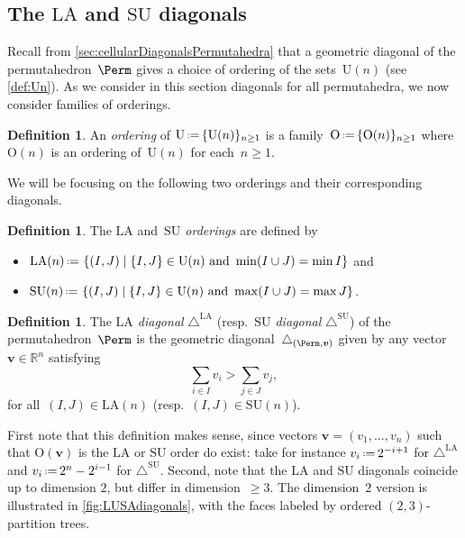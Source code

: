 \documentclass{amsart}
\newcommand{\darkblue}{\color{darkblue}} %
\theoremstyle{definition}
\newtheorem{definition}[theorem]{Definition}
\newcommand{\R}{\mathbb{R}} %
\renewcommand{\b}[1]{{\boldsymbol{#1}}} %
\newcommand{\Un}{\mathrm{U}} %
\newcommand{\Or}{\mathrm{O}} %
\newcommand{\set}[2]{\left\{ #1 \;\middle|\; #2 \right\}} %
\newcommand{\eqdef}{\mbox{\,\raisebox{0.2ex}{\scriptsize\ensuremath{\mathrm:}}\ensuremath{=}\,}} %
\newcommand{\resp}{resp.~} %
\newcommand{\defn}[1]{\textsl{\darkblue #1}} %
\renewcommand{\b}[1]{\boldsymbol{#1}} %
\newcommand{\SU}{\mathrm{SU}}
\newcommand{\LA}{\mathrm{LA}}
\newcommand{\SUD}{\triangle^{\mathrm{SU}}}
\newcommand{\LAD}{\triangle^{\mathrm{LA}}}
\begin{document}

\subsection{The $\LA$ and $\SU$ diagonals}
\label{subsec:LASUdiagonal}

Recall from \cref{sec:cellularDiagonalsPermutahedra} that a geometric diagonal of the permutahedron~$\Perm$ gives a choice of ordering of the sets~$\Un(n)$ (see \cref{def:Un}).
As we consider in this section diagonals for all permutahedra, we now consider families of orderings.

\begin{definition}
An \defn{ordering} of $\Un \eqdef \{\Un(n)\}_{n \ge 1}$ is a family~$\Or \eqdef \{\Or(n)\}_{n \ge 1}$ where~$\Or(n)$ is an ordering of~$\Un(n)$ for each~$n \ge 1$.
\end{definition}

We will be focusing on the following two orderings and their corresponding diagonals.

\begin{definition}
The \defn{$\LA$} and~\defn{$\SU$ orderings} are defined by
\begin{itemize} 
	\item $\LA(n) \eqdef \set{(I,J)}{\{I,J\} \in \Un(n) \text{ and } \min(I\cup J) = \min I}$ and
	\item $\SU(n) \eqdef \set{(I,J)}{\{I,J\} \in \Un(n) \text{ and } \max(I\cup J) = \max J}$.
\end{itemize}
\end{definition}

\begin{definition}
\label{def:LA-and-SU}
The \defn{$\LA$ diagonal} $\LAD$ (\resp \defn{$\SU$ diagonal} $\SUD$) of the permutahedron~$\Perm$ is the geometric diagonal~$\triangle_{(\Perm,\b{v})}$ given by any vector $\b{v} \in \R^n$ satisfying  
\[
\sum_{i \in I} v_i > \sum_{j \in J} v_j,
\]
for all~$(I,J) \in \LA(n)$ (\resp $(I,J) \in \SU(n)$).
\end{definition}

First note that this definition makes sense, since vectors $\b{v}=(v_1,\ldots,v_n)$ such that $\Or(\b{v})$ is the $\LA$ or $\SU$ order do exist: take for instance $v_i\eqdef 2^{-i+1}$ for $\LAD$ and $v_i \eqdef 2^n - 2^{i-1}$ for $\SUD$.
Second, note that the $\LA$ and $\SU$ diagonals coincide up to dimension $2$, but differ in dimension~$\ge 3$.
The dimension~$2$ version is illustrated in \cref{fig:LUSAdiagonals}, with the faces labeled by ordered $(2,3)$-partition trees.
\end{document}
